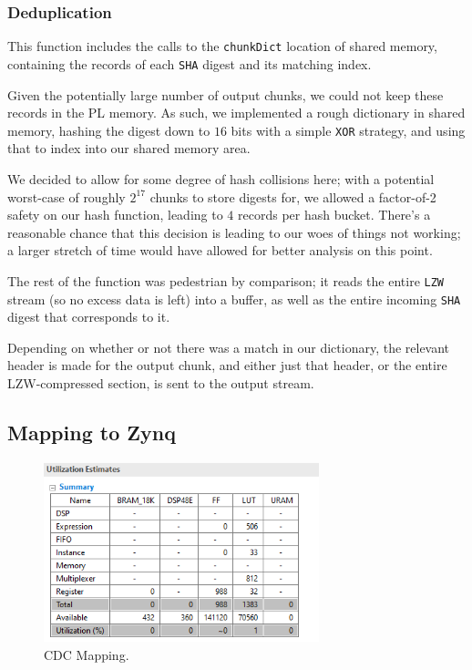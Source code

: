 \documentclass{article}
\begin{document}
\subsubsection{Deduplication}

This function includes the calls to the \texttt{chunkDict} location of shared memory, containing the records of each \texttt{SHA} digest and its matching index.
\newline\par
Given the potentially large number of output chunks, we could not keep these records in the PL memory. 
As such, we implemented a rough dictionary in shared memory, hashing the digest down to $16$ bits with a simple \texttt{XOR} strategy,
and using that to index into our shared memory area.
\par
We decided to allow for some degree of hash collisions here; with a potential worst-case of roughly $2^{17}$ chunks to store digests for,
we allowed a factor-of-2 safety on our hash function, leading to $4$ records per hash bucket. 
There's a reasonable chance that this decision
is leading to our woes of things not working; a larger stretch of time would have allowed for better analysis on this point.

\par
The rest of the function was pedestrian by comparison; it reads the entire \texttt{LZW} stream (so no excess data is left) into a buffer,
as well as the entire incoming \texttt{SHA} digest that corresponds to it.
\par
Depending on whether or not there was a match in our dictionary, the relevant header is made for the output chunk,
and either just that header, or the entire LZW-compressed section, is sent to the output stream.


\subsection{Mapping to Zynq}
\begin{figure}[hbt!]
  \includegraphics[width=80mm, scale=0.5]{rabin.png}
  \caption{CDC Mapping.}
  \label{fig:cdc_mapping}
\end{figure}
\end{document}
